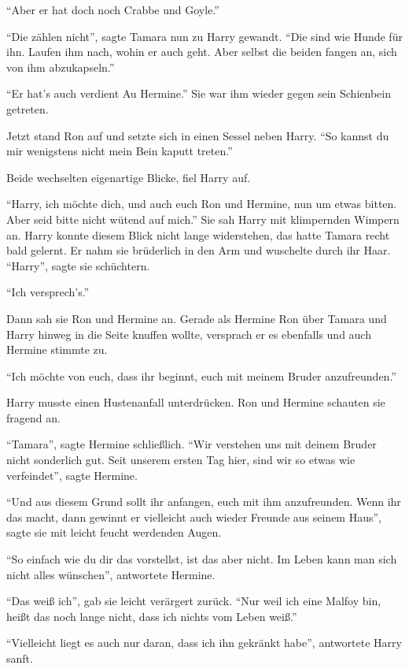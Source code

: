 \enquote{Aber er hat doch noch Crabbe und Goyle.}

\enquote{Die zählen nicht}, sagte Tamara nun zu Harry gewandt. \enquote{Die sind wie Hunde für ihn. Laufen ihm nach, wohin er auch geht. Aber selbst die beiden fangen an, sich von ihm abzukapseln.}

\enquote{Er hat's auch verdient \gst Au \gst Hermine.} Sie war ihm wieder gegen sein Schienbein getreten.

Jetzt stand Ron auf und setzte sich in einen Sessel neben Harry. \enquote{So kannst du mir wenigstens nicht mein Bein kaputt treten.}

Beide wechselten eigenartige Blicke, fiel Harry auf.

\enquote{Harry, ich möchte dich, und auch euch Ron und Hermine, nun um etwas bitten. Aber seid bitte nicht wütend auf mich.} Sie sah Harry mit klimpernden Wimpern an. Harry konnte diesem Blick nicht lange widerstehen, das hatte Tamara recht bald gelernt. Er nahm sie brüderlich in den Arm und wuschelte durch ihr Haar. \enquote{Harry}, sagte sie schüchtern.

\enquote{Ich versprech's.}

Dann sah sie Ron und Hermine an. Gerade als Hermine Ron über Tamara und Harry hinweg in die Seite knuffen wollte, versprach er es ebenfalls und auch Hermine stimmte zu.

\enquote{Ich möchte von euch, dass ihr beginnt, euch mit meinem Bruder anzufreunden.}

Harry musste einen Hustenanfall unterdrücken. Ron und Hermine schauten sie fragend an.

\enquote{Tamara}, sagte Hermine schließlich. \enquote{Wir verstehen uns mit deinem Bruder nicht sonderlich gut. Seit unserem ersten Tag hier, sind wir so etwas wie verfeindet}, sagte Hermine.

\enquote{Und aus diesem Grund sollt ihr anfangen, euch mit ihm anzufreunden. Wenn ihr das macht, dann gewinnt er vielleicht auch wieder Freunde aus seinem Haus}, sagte sie mit leicht feucht werdenden Augen.

\enquote{So einfach wie du dir das vorstellst, ist das aber nicht. Im Leben kann man sich nicht alles wünschen}, antwortete Hermine.

\enquote{Das weiß ich}, gab sie leicht verärgert zurück. \enquote{Nur weil ich eine Malfoy bin, heißt das noch lange nicht, dass ich nichts vom Leben weiß.}

\enquote{Vielleicht liegt es auch nur daran, dass ich ihn gekränkt habe}, antwortete Harry sanft.

